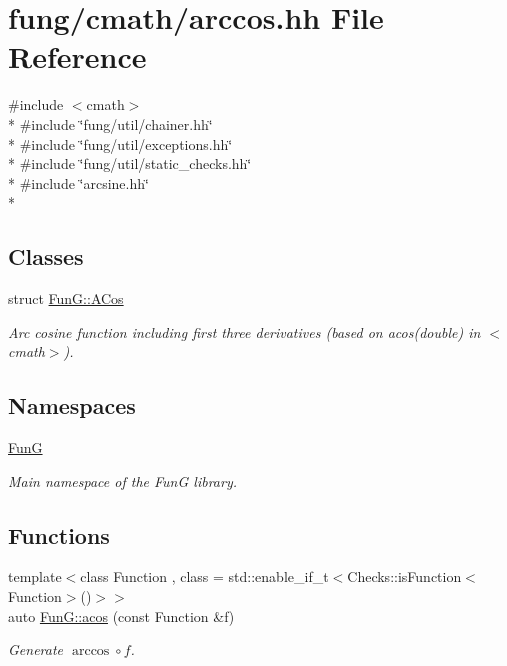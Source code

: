 \hypertarget{arccos_8hh}{}\section{fung/cmath/arccos.hh File Reference}
\label{arccos_8hh}
{\ttfamily \#include $<$cmath$>$}\\*
{\ttfamily \#include \char`\"{}fung/util/chainer.\+hh\char`\"{}}\\*
{\ttfamily \#include \char`\"{}fung/util/exceptions.\+hh\char`\"{}}\\*
{\ttfamily \#include \char`\"{}fung/util/static\+\_\+checks.\+hh\char`\"{}}\\*
{\ttfamily \#include \char`\"{}arcsine.\+hh\char`\"{}}\\*
\subsection*{Classes}
\begin{DoxyCompactItemize}
\item 
struct \hyperlink{structFunG_1_1ACos}{Fun\+G\+::\+A\+Cos}
\begin{DoxyCompactList}\small\item\em Arc cosine function including first three derivatives (based on acos(double) in $<$cmath$>$). \end{DoxyCompactList}\end{DoxyCompactItemize}
\subsection*{Namespaces}
\begin{DoxyCompactItemize}
\item 
 \hyperlink{namespaceFunG}{FunG}
\begin{DoxyCompactList}\small\item\em Main namespace of the FunG library. \end{DoxyCompactList}\end{DoxyCompactItemize}
\subsection*{Functions}
\begin{DoxyCompactItemize}
\item 
{\footnotesize template$<$class Function , class  = std\+::enable\+\_\+if\+\_\+t$<$\+Checks\+::is\+Function$<$\+Function$>$()$>$$>$ }\\auto \hyperlink{group__CMathGroup_gae9b7d3a479bcd8d48cf25f1c29edefb9}{Fun\+G\+::acos} (const Function \&f)
\begin{DoxyCompactList}\small\item\em Generate $ \arccos\circ f $. \end{DoxyCompactList}\end{DoxyCompactItemize}
